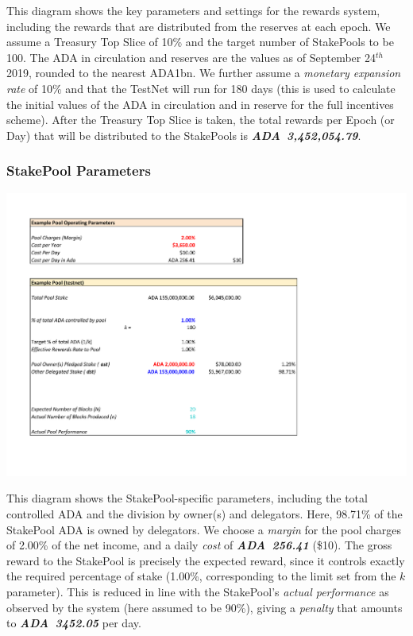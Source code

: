 \documentclass[11pt,a4paper,dvipsnames,twosided,final]{article}
\newcommand{\ada}{ADA{}}
\newcommand{\ADA}[1]{\textbf{\emph{\ada~{#1}}}}
\begin{document}
\begin{minipage}{\textwidth}
\noindent
This diagram shows the key parameters and settings for the rewards system, including the
rewards that are distributed from the reserves at each epoch.  We assume a Treasury Top Slice
of 10\% and the target number of StakePools to be 100.  The \ada{} in circulation and reserves
are the values as of September 24$^{th}$ 2019, rounded to the nearest ADA{1bn}.  We further
assume a \emph{monetary expansion rate} of 10\% and that the TestNet will run for 180 days
(this is used to calculate the initial values of the \ada{} in circulation and in reserve
for the full incentives scheme).  After the Treasury Top Slice is taken, the total
rewards per Epoch (or Day) that will be distributed to the StakePools is \ADA{3,452,054.79}.
\end{minipage}

\clearpage
\subsubsection*{StakePool Parameters}
\includegraphics[width=1.2\textwidth]{RCT3.pdf}
\vspace{-0.5in}

\noindent
This diagram shows the StakePool-specific parameters, including the total controlled \ada{} and the
division by owner(s) and delegators.  Here, 98.71\% of the StakePool \ada{} is owned
by delegators.  We choose a \emph{margin} for the pool charges of 2.00\% of the net income,
and a daily \emph{cost} of \ADA{256.41} (\$10).
The gross reward to the StakePool is precisely the expected reward, since it controls
exactly the required percentage of stake (1.00\%, corresponding to the limit set from
the $k$ parameter).  This is reduced in line with the StakePool's \emph{actual performance}
as observed by the system (here assumed to be 90\%), giving a \emph{penalty} that amounts
to \ADA{3452.05} per day.
\end{document}

